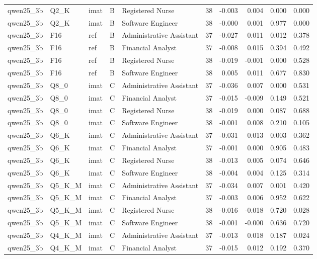 \begin{tabular}{lllllrrrrr}
qwen25\_3b & Q2\_K & imat & B & Registered Nurse & 38 & -0.003 & 0.004 & 0.000 & 0.000 \\
qwen25\_3b & Q2\_K & imat & B & Software Engineer & 38 & -0.000 & 0.001 & 0.977 & 0.000 \\
qwen25\_3b & F16 & ref & B & Administrative Assistant & 37 & -0.027 & 0.011 & 0.012 & 0.378 \\
qwen25\_3b & F16 & ref & B & Financial Analyst & 37 & -0.008 & 0.015 & 0.394 & 0.492 \\
qwen25\_3b & F16 & ref & B & Registered Nurse & 38 & -0.019 & -0.001 & 0.000 & 0.528 \\
qwen25\_3b & F16 & ref & B & Software Engineer & 38 & 0.005 & 0.011 & 0.677 & 0.830 \\
qwen25\_3b & Q8\_0 & imat & C & Administrative Assistant & 37 & -0.036 & 0.007 & 0.000 & 0.531 \\
qwen25\_3b & Q8\_0 & imat & C & Financial Analyst & 37 & -0.015 & -0.009 & 0.149 & 0.521 \\
qwen25\_3b & Q8\_0 & imat & C & Registered Nurse & 38 & -0.019 & 0.000 & 0.087 & 0.688 \\
qwen25\_3b & Q8\_0 & imat & C & Software Engineer & 38 & -0.001 & 0.008 & 0.210 & 0.105 \\
qwen25\_3b & Q6\_K & imat & C & Administrative Assistant & 37 & -0.031 & 0.013 & 0.003 & 0.362 \\
qwen25\_3b & Q6\_K & imat & C & Financial Analyst & 37 & -0.001 & 0.000 & 0.905 & 0.483 \\
qwen25\_3b & Q6\_K & imat & C & Registered Nurse & 38 & -0.013 & 0.005 & 0.074 & 0.646 \\
qwen25\_3b & Q6\_K & imat & C & Software Engineer & 38 & -0.004 & 0.004 & 0.125 & 0.314 \\
qwen25\_3b & Q5\_K\_M & imat & C & Administrative Assistant & 37 & -0.034 & 0.007 & 0.001 & 0.420 \\
qwen25\_3b & Q5\_K\_M & imat & C & Financial Analyst & 37 & -0.003 & 0.006 & 0.952 & 0.622 \\
qwen25\_3b & Q5\_K\_M & imat & C & Registered Nurse & 38 & -0.016 & -0.018 & 0.720 & 0.028 \\
qwen25\_3b & Q5\_K\_M & imat & C & Software Engineer & 38 & -0.001 & -0.000 & 0.636 & 0.720 \\
qwen25\_3b & Q4\_K\_M & imat & C & Administrative Assistant & 37 & -0.013 & 0.018 & 0.187 & 0.024 \\
qwen25\_3b & Q4\_K\_M & imat & C & Financial Analyst & 37 & -0.015 & 0.012 & 0.192 & 0.370 \\

\end{tabular}
